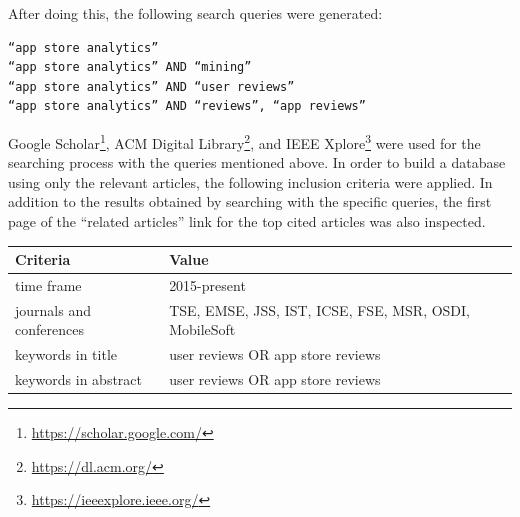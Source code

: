 \documentclass[]{book}
\let\rmarkdownfootnote\footnote%
\def\footnote{\protect\rmarkdownfootnote}
\begin{document}
After doing this, the following search queries were generated:

\begin{verbatim}
“app store analytics” 
“app store analytics” AND “mining” 
“app store analytics” AND “user reviews” 
“app store analytics” AND “reviews”, “app reviews”
\end{verbatim}

Google Scholar\footnote{\url{https://scholar.google.com/}}, ACM Digital
Library\footnote{\url{https://dl.acm.org/}}, and IEEE Xplore\footnote{\url{https://ieeexplore.ieee.org/}}
were used for the searching process with the queries mentioned above. In
order to build a database using only the relevant articles, the
following inclusion criteria were applied. In addition to the results
obtained by searching with the specific queries, the first page of the
``related articles'' link for the top cited articles was also inspected.

\begin{longtable}[]{@{}ll@{}}
\toprule
\begin{minipage}[b]{0.22\columnwidth}\raggedright\strut
Criteria\strut
\end{minipage} & \begin{minipage}[b]{0.18\columnwidth}\raggedright\strut
Value\strut
\end{minipage}\tabularnewline
\midrule
\endhead
\begin{minipage}[t]{0.22\columnwidth}\raggedright\strut
time frame\strut
\end{minipage} & \begin{minipage}[t]{0.18\columnwidth}\raggedright\strut
2015-present\strut
\end{minipage}\tabularnewline
\begin{minipage}[t]{0.22\columnwidth}\raggedright\strut
journals and conferences\strut
\end{minipage} & \begin{minipage}[t]{0.18\columnwidth}\raggedright\strut
TSE, EMSE, JSS, IST, ICSE, FSE, MSR, OSDI, MobileSoft\strut
\end{minipage}\tabularnewline
\begin{minipage}[t]{0.22\columnwidth}\raggedright\strut
keywords in title\strut
\end{minipage} & \begin{minipage}[t]{0.18\columnwidth}\raggedright\strut
user reviews OR app store reviews\strut
\end{minipage}\tabularnewline
\begin{minipage}[t]{0.22\columnwidth}\raggedright\strut
keywords in abstract\strut
\end{minipage} & \begin{minipage}[t]{0.18\columnwidth}\raggedright\strut
user reviews OR app store reviews\strut
\end{minipage}\tabularnewline
\bottomrule
\end{longtable}
\end{document}

